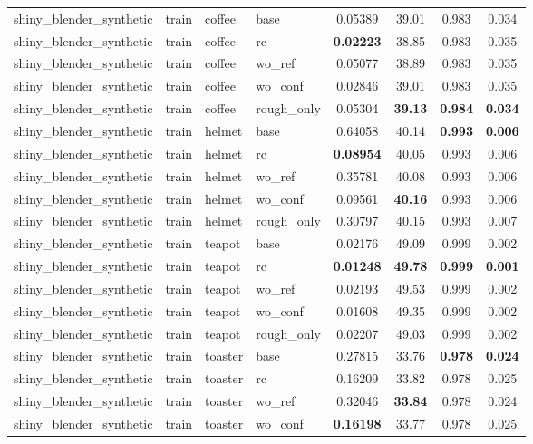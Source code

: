 \begin{table}[t]
{\begin{tabular}{llllcccc}
shiny\_blender\_synthetic & train & coffee & base & 0.05389 & 39.01 & 0.983 & 0.034 \\
shiny\_blender\_synthetic & train & coffee & rc & \textbf{0.02223} & 38.85 & 0.983 & 0.035 \\
shiny\_blender\_synthetic & train & coffee & wo\_ref & 0.05077 & 38.89 & 0.983 & 0.035 \\
shiny\_blender\_synthetic & train & coffee & wo\_conf & 0.02846 & 39.01 & 0.983 & 0.035 \\
shiny\_blender\_synthetic & train & coffee & rough\_only & 0.05304 & \textbf{39.13} & \textbf{0.984} & \textbf{0.034} \\
shiny\_blender\_synthetic & train & helmet & base & 0.64058 & 40.14 & \textbf{0.993} & \textbf{0.006} \\
shiny\_blender\_synthetic & train & helmet & rc & \textbf{0.08954} & 40.05 & 0.993 & 0.006 \\
shiny\_blender\_synthetic & train & helmet & wo\_ref & 0.35781 & 40.08 & 0.993 & 0.006 \\
shiny\_blender\_synthetic & train & helmet & wo\_conf & 0.09561 & \textbf{40.16} & 0.993 & 0.006 \\
shiny\_blender\_synthetic & train & helmet & rough\_only & 0.30797 & 40.15 & 0.993 & 0.007 \\
shiny\_blender\_synthetic & train & teapot & base & 0.02176 & 49.09 & 0.999 & 0.002 \\
shiny\_blender\_synthetic & train & teapot & rc & \textbf{0.01248} & \textbf{49.78} & \textbf{0.999} & \textbf{0.001} \\
shiny\_blender\_synthetic & train & teapot & wo\_ref & 0.02193 & 49.53 & 0.999 & 0.002 \\
shiny\_blender\_synthetic & train & teapot & wo\_conf & 0.01608 & 49.35 & 0.999 & 0.002 \\
shiny\_blender\_synthetic & train & teapot & rough\_only & 0.02207 & 49.03 & 0.999 & 0.002 \\
shiny\_blender\_synthetic & train & toaster & base & 0.27815 & 33.76 & \textbf{0.978} & \textbf{0.024} \\
shiny\_blender\_synthetic & train & toaster & rc & 0.16209 & 33.82 & 0.978 & 0.025 \\
shiny\_blender\_synthetic & train & toaster & wo\_ref & 0.32046 & \textbf{33.84} & 0.978 & 0.024 \\
shiny\_blender\_synthetic & train & toaster & wo\_conf & \textbf{0.16198} & 33.77 & 0.978 & 0.025 \\

\end{tabular}}
\end{table}
